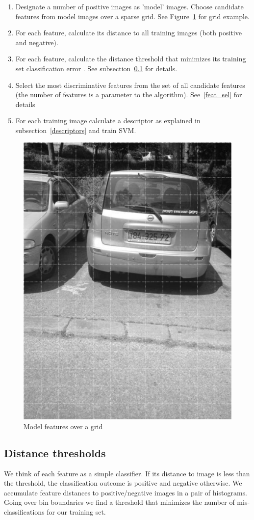 \documentclass[12pt]{article}
\begin{document}
\begin{enumerate}
\item Designate a number of positive images as 'model' images.  Choose candidate features from model images over a sparse grid.  See Figure~\ref{fig:sub2} for grid example.
\item For each feature, calculate its distance to all training images (both positive and negative).
\item For each feature, calculate the distance threshold that minimizes its training set classification error . See subsection~\ref{calc_thresh} for details.
\item Select the most discriminative features from the set of all candidate features (the number of features is a parameter to the algorithm). See~\ref{feat_sel} for details
\item For each training image calculate a descriptor as explained in subsection~\ref{descriptors} and train SVM.
\end{enumerate}

\begin{figure} \centering
	\includegraphics[width=.4\linewidth]{model_feats.png}
	\caption{Model features over a grid}
	\label{fig:sub2}
\end{figure}

\subsection{Distance thresholds}\label{calc_thresh}
We think of each feature as a simple classifier.  If its distance to image is less than the threshold, the classification outcome is positive and negative otherwise. We accumulate feature distances to positive/negative images in a pair of histograms.  Going over bin boundaries we find a threshold that minimizes the number of mis-classifications for our training set.
\end{document}
